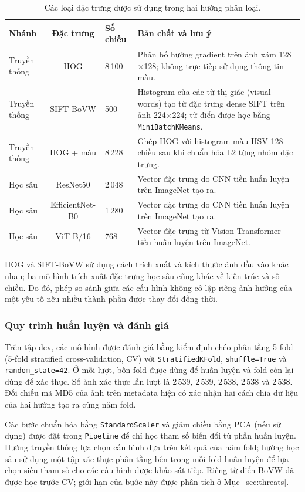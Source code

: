 \begin{table}[H]\centering
\caption{Các loại đặc trưng được sử dụng trong hai hướng phân loại.}
\label{tab:features}
\small\begin{tabularx}{\linewidth}{@{}lclX@{}}\toprule
Nhánh & Đặc trưng & Số chiều & Bản chất và lưu ý\\\midrule
Truyền thống & HOG & 8\,100 & Phân bố hướng gradient trên ảnh xám 128$\times$128; không trực tiếp sử dụng thông tin màu.\\
Truyền thống & SIFT-BoVW & 500 & Histogram của các từ thị giác (visual words) tạo từ đặc trưng dense SIFT trên ảnh 224$\times$224; từ điển được học bằng \texttt{MiniBatchKMeans}.\\
Truyền thống & HOG + màu & 8\,228 & Ghép HOG với histogram màu HSV 128 chiều sau khi chuẩn hóa L2 từng nhóm đặc trưng.\\
Học sâu & ResNet50 & 2\,048 & Vector đặc trưng do CNN tiền huấn luyện trên ImageNet tạo ra.\\
Học sâu & EfficientNet-B0 & 1\,280 & Vector đặc trưng do CNN tiền huấn luyện trên ImageNet tạo ra.\\
Học sâu & ViT-B/16 & 768 & Vector đặc trưng từ Vision Transformer tiền huấn luyện trên ImageNet.\\\bottomrule
\end{tabularx}
\end{table}

HOG và SIFT-BoVW sử dụng cách trích xuất và kích thước ảnh đầu vào khác nhau; ba mô hình trích xuất đặc trưng học sâu cũng khác về kiến trúc và số chiều. Do đó, phép so sánh giữa các cấu hình không cô lập riêng ảnh hưởng của một yếu tố nếu nhiều thành phần được thay đổi đồng thời.

\subsubsection{Quy trình huấn luyện và đánh giá}
Trên tập dev, các mô hình được đánh giá bằng kiểm định chéo phân tầng 5 fold (5-fold stratified cross-validation, CV) với \texttt{StratifiedKFold}, \texttt{shuffle=True} và \texttt{random\_state=42}. Ở mỗi lượt, bốn fold được dùng để huấn luyện và fold còn lại dùng để xác thực. Số ảnh xác thực lần lượt là 2\,539, 2\,539, 2\,538, 2\,538 và 2\,538. Đối chiếu mã MD5 của ảnh trên metadata hiện có xác nhận hai cách chia dữ liệu của hai hướng tạo ra cùng năm fold.

Các bước chuẩn hóa bằng \texttt{StandardScaler} và giảm chiều bằng PCA (nếu sử dụng) được đặt trong \texttt{Pipeline} để chỉ học tham số biến đổi từ phần huấn luyện. Hướng truyền thống lựa chọn cấu hình dựa trên kết quả của năm fold; hướng học sâu sử dụng một tập xác thực phân tầng bên trong mỗi fold huấn luyện để lựa chọn siêu tham số cho các cấu hình được khảo sát tiếp. Riêng từ điển BoVW đã được học trước CV; giới hạn của bước này được phân tích ở Mục~\ref{sec:threats}.


